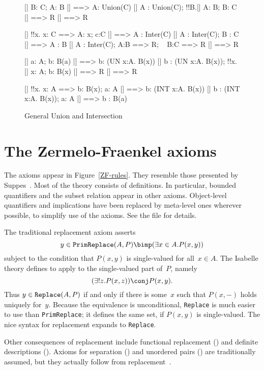 \begin{figure}
\begin{ttbox}
    [| B: C;  A: B |] ==> A: Union(C)
    [| A : Union(C);  !!B.[| A: B;  B: C |] ==> R |] ==> R

    [| !!x. x: C ==> A: x;  c:C |] ==> A : Inter(C)
    [| A : Inter(C);  B : C |] ==> A : B
    [| A : Inter(C);  A:B ==> R;  ~ B:C ==> R |] ==> R

      [| a: A;  b: B(a) |] ==> b: (UN x:A. B(x))
      [| b : (UN x:A. B(x));  !!x.[| x: A;  b: B(x) |] ==> R 
          |] ==> R

     [| !!x. x: A ==> b: B(x);  a: A |] ==> b: (INT x:A. B(x))
     [| b : (INT x:A. B(x));  a: A |] ==> b : B(a)
\end{ttbox}
\caption{General Union and Intersection} \label{ZF-lemmas3}
\end{figure}


\section{The Zermelo-Fraenkel axioms}
The axioms appear in Figure~\ref{ZF-rules}.  They resemble those
presented by Suppes~\cite{suppes72}.  Most of the theory consists of
definitions.  In particular, bounded quantifiers and the subset relation
appear in other axioms.  Object-level quantifiers and implications have
been replaced by meta-level ones wherever possible, to simplify use of the
axioms.  See the file  for details.

The traditional replacement axiom asserts
\[ y \in {\tt PrimReplace}(A,P) \bimp (\exists x\in A. P(x,y)) \]
subject to the condition that $P(x,y)$ is single-valued for all~$x\in A$.
The Isabelle theory defines  to apply
 to the single-valued part of~$P$, namely
\[ (\exists!z.P(x,z)) \conj P(x,y). \]
Thus $y\in {\tt Replace}(A,P)$ if and only if there is some~$x$ such that
$P(x,-)$ holds uniquely for~$y$.  Because the equivalence is unconditional,
{\tt Replace} is much easier to use than {\tt PrimReplace}; it defines the
same set, if $P(x,y)$ is single-valued.  The nice syntax for replacement
expands to {\tt Replace}.

Other consequences of replacement include functional replacement
() and definite descriptions ().
Axioms for separation () and unordered pairs
() are traditionally assumed, but they actually follow
from replacement~\cite[pages 237--8]{suppes72}.

